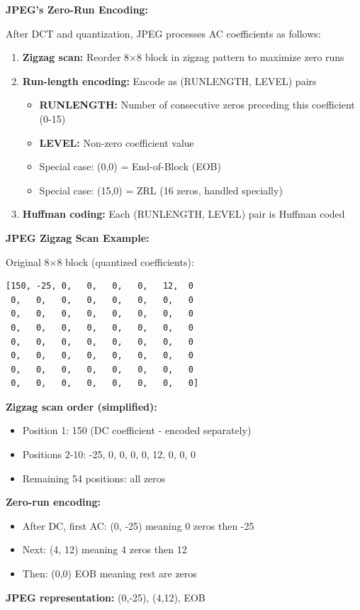 \begin{importantbox}
\textbf{JPEG's Zero-Run Encoding:}

After DCT and quantization, JPEG processes AC coefficients as follows:
\begin{enumerate}
    \item \textbf{Zigzag scan:} Reorder 8×8 block in zigzag pattern to maximize zero runs
    \item \textbf{Run-length encoding:} Encode as (RUNLENGTH, LEVEL) pairs
    \begin{itemize}
        \item \textbf{RUNLENGTH:} Number of consecutive zeros preceding this coefficient (0-15)
        \item \textbf{LEVEL:} Non-zero coefficient value
        \item Special case: (0,0) = End-of-Block (EOB)
        \item Special case: (15,0) = ZRL (16 zeros, handled specially)
    \end{itemize}
    \item \textbf{Huffman coding:} Each (RUNLENGTH, LEVEL) pair is Huffman coded
\end{enumerate}
\end{importantbox}

\begin{examplebox}
\textbf{JPEG Zigzag Scan Example:}

Original 8×8 block (quantized coefficients):
\begin{verbatim}
[150, -25, 0,   0,   0,   0,   12,  0
 0,   0,   0,   0,   0,   0,   0,   0
 0,   0,   0,   0,   0,   0,   0,   0
 0,   0,   0,   0,   0,   0,   0,   0
 0,   0,   0,   0,   0,   0,   0,   0
 0,   0,   0,   0,   0,   0,   0,   0
 0,   0,   0,   0,   0,   0,   0,   0
 0,   0,   0,   0,   0,   0,   0,   0]
\end{verbatim}

\textbf{Zigzag scan order (simplified):}
\begin{itemize}
    \item Position 1: 150 (DC coefficient - encoded separately)
    \item Positions 2-10: -25, 0, 0, 0, 0, 12, 0, 0, 0
    \item Remaining 54 positions: all zeros
\end{itemize}

\textbf{Zero-run encoding:}
\begin{itemize}
    \item After DC, first AC: (0, -25) meaning 0 zeros then -25
    \item Next: (4, 12) meaning 4 zeros then 12
    \item Then: (0,0) EOB meaning rest are zeros
\end{itemize}

\textbf{JPEG representation:} (0,-25), (4,12), EOB
\end{examplebox}

